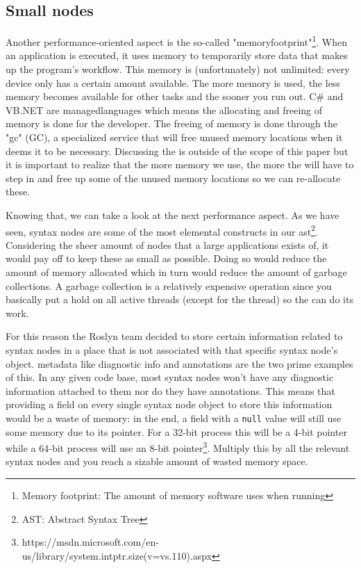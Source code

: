 \newpage
\subsection{Small nodes}
\label{sec:small-nodes}

Another performance-oriented aspect is the so-called "\gls{memoryfootprint}"\footnote{Memory footprint: The amount of memory software uses when running}. When an application is executed, it uses memory to temporarily store data that makes up the program's workflow. This memory is (unfortunately) not unlimited: every device only has a certain amount available. The more memory is used, the less memory becomes available for other tasks and the sooner you run out. C\# and VB.NET are \glspl{managedlanguage} which means the allocating and freeing of memory is done for the developer. The freeing of memory is done through the "\gls{gc}" (GC), a specialized service that will free unused memory locations when it deems it to be necessary. Discussing the  is outside of the scope of this paper but it is important to realize that the more memory we use, the more the  will have to step in and free up some of the unused memory locations so we can re-allocate these.\parencite{Todorov2013}

Knowing that, we can take a look at the next performance aspect. As we have seen, syntax nodes are some of the most elemental constructs in our \gls{ast}\footnote{AST: Abstract Syntax Tree}. Considering the sheer amount of nodes that a large applications exists of, it would pay off to keep these as small as possible. Doing so would reduce the amount of memory allocated which in turn would reduce the amount of garbage collections. A garbage collection is a relatively expensive operation since you basically put a hold on all active threads (except for the  thread) so the  can do its work.\parencite{Botelho2014}

For this reason the Roslyn team decided to store certain information related to syntax nodes in a place that is not associated with that specific syntax node's object.\parencite{Sadov2014} \Gls{metadata} like diagnostic info and annotations are the two prime examples of this. In any given code base, most syntax nodes won't have any diagnostic information attached to them nor do they have annotations. This means that providing a field on every single syntax node object to store this information would be a waste of memory: in the end, a field with a \texttt{null} value will still use some memory due to its pointer. For a 32-bit process this will be a 4-bit pointer while a 64-bit process will use an 8-bit pointer\footnote{https://msdn.microsoft.com/en-us/library/system.intptr.size(v=vs.110).aspx}. Multiply this by all the relevant syntax nodes and you reach a sizable amount of wasted memory space.

